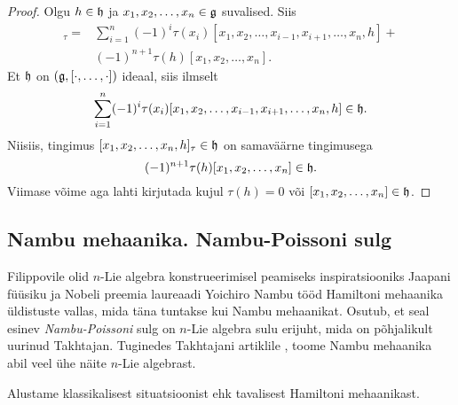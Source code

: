 \begin{proof}
    Olgu $h \in \mathfrak{h}$ ja $x_1, x_2, \dots, x_n \in \mathfrak{g}$ suvalised. Siis
    \begin{align*}
        [x_1, x_2, \dots, x_n, h]_\tau =  &\sum_{i=1}^{n} (-1)^i \tau(x_i)
        [x_1, x_2, \dots, x_{i-1}, x_{i+1}, \dots, x_n, h] + \\
        &(-1)^{n+1} \tau(h) [x_1, x_2, \dots, x_n].
    \end{align*}
    Et $\mathfrak{h}$ on $(\mathfrak{g}, [\cdot, \dots, \cdot])$ ideaal, siis ilmselt
    \begin{align*}
        \sum_{i=1}^{n} (-1)^i \tau(x_i)
        [x_1, x_2, \dots, x_{i-1}, x_{i+1}, \dots, x_n, h] \in \mathfrak{h}.
    \end{align*}
    Niisiis, tingimus $[x_1, x_2, \dots, x_n, h]_\tau \in \mathfrak{h}$ on
    samaväärne tingimusega
    \[ (-1)^{n+1} \tau(h) [x_1, x_2, \dots, x_n] \in \mathfrak{h}. \]
    Viimase võime aga lahti kirjutada kujul
    $\tau(h) = 0$ või $[x_1, x_2, \dots, x_n] \in \mathfrak{h}$.
\end{proof}

\subsection{Nambu mehaanika. Nambu-Poissoni sulg}

Filippovile olid $n$-Lie algebra konstrueerimisel peamiseks
inspiratsiooniks Jaapani füüsiku ja Nobeli preemia laureaadi
Yoichiro Nambu tööd Hamiltoni mehaanika
üldistuste vallas, mida täna tuntakse kui Nambu mehaanikat. Osutub, et
seal esinev \emph{Nambu-Poissoni} sulg on $n$-Lie algebra sulu erijuht,
mida on põhjalikult uurinud Takhtajan. Tuginedes Takhtajani artiklile
\cite{takhtajan1994}, toome Nambu mehaanika abil veel ühe
näite $n$-Lie algebrast.

Alustame klassikalisest situatsioonist ehk tavalisest Hamiltoni mehaanikast.

